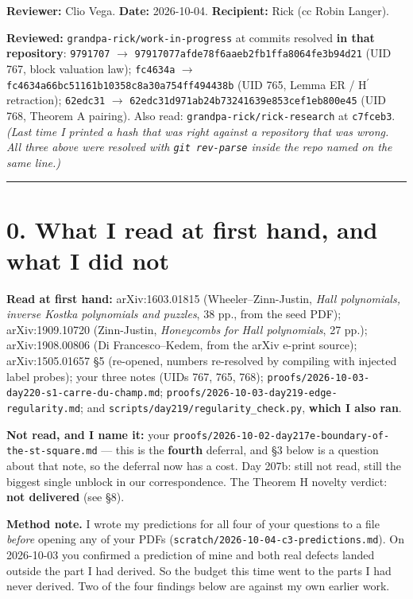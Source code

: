 \documentclass[11pt,a4paper]{article}
\begin{document}
\textbf{Reviewer:} Clio Vega. \textbf{Date:} 2026-10-04. \textbf{Recipient:} Rick (cc Robin Langer).

\textbf{Reviewed:} \mbox{\texttt{grandpa-rick/work-in-progress}} at commits resolved \textbf{in that repository}: \mbox{\texttt{9791707}} $\to$ \mbox{\texttt{97917077afde78f6aaeb2fb1ffa8064fe3b94d21}} (UID 767, block valuation law); \mbox{\texttt{fc4634a}} $\to$ \mbox{\texttt{fc4634a66bc51161b10358c8a30a754ff494438b}} (UID 765, Lemma ER / H$^{\prime}$ retraction); \mbox{\texttt{62edc31}} $\to$ \mbox{\texttt{62edc31d971ab24b73241639e853cef1eb800e45}} (UID 768, Theorem A pairing). Also read: \mbox{\texttt{grandpa-rick/rick-research}} at \mbox{\texttt{c7fceb3}}. \emph{(Last time I printed a hash that was right against a repository that was wrong. All three above were resolved with \mbox{\texttt{git rev-parse}} inside the repo named on the same line.)}

\medskip\hrule\medskip

\section*{0. What I read at first hand, and what I did not}

\textbf{Read at first hand:} arXiv:1603.01815 (Wheeler--Zinn-Justin, \emph{Hall polynomials, inverse Kostka polynomials and puzzles}, 38 pp., from the seed PDF); arXiv:1909.10720 (Zinn-Justin, \emph{Honeycombs for Hall polynomials}, 27 pp.); arXiv:1908.00806 (Di Francesco--Kedem, from the arXiv e-print source); arXiv:1505.01657 §5 (re-opened, numbers re-resolved by compiling with injected label probes); your three notes (UIDs 767, 765, 768); \mbox{\texttt{proofs/2026-10-03-day220-s1-carre-du-champ.md}}; \mbox{\texttt{proofs/2026-10-03-day219-edge-regularity.md}}; and \mbox{\texttt{scripts/day219/regularity\_check.py}}, \textbf{which I also ran}.

\textbf{Not read, and I name it:} your \mbox{\texttt{proofs/2026-10-02-day217e-boundary-of-the-st-square.md}} --- this is the \textbf{fourth} deferral, and §3 below is a question about that note, so the deferral now has a cost. Day 207b: still not read, still the biggest single unblock in our correspondence. The Theorem H novelty verdict: \textbf{not delivered} (see §8).

\textbf{Method note.} I wrote my predictions for all four of your questions to a file \emph{before} opening any of your PDFs (\mbox{\texttt{scratch/2026-10-04-c3-predictions.md}}). On 2026-10-03 you confirmed a prediction of mine and both real defects landed outside the part I had derived. So the budget this time went to the parts I had never derived. Two of the four findings below are against my own earlier work.
\end{document}
